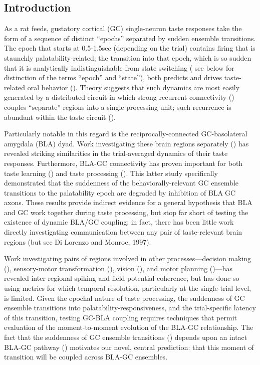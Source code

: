 \begin{refsection}
\section{Introduction}
As a rat feeds, gustatory cortical (GC) single-neuron taste responses take the form of a sequence of distinct “epochs” separated by sudden ensemble transitions. The epoch that starts at 0.5-1.5sec (depending on the trial) contains firing that is staunchly palatability-related; the transition into that epoch, which is so sudden that it is analytically indistinguishable from state switching (\cite{sadacca2016a} see below for distinction of the terms “epoch” and “state”), both predicts and drives taste-related oral behavior (\cite{sadacca2012a,li2016a,mukherjee2019a}). Theory suggests that such dynamics are most easily generated by a distributed circuit in which strong recurrent connectivity (\cite{maass2007a, miller2010a, miller2013a,edelman2013a,mante2013a,kietzmann2019a}) couples “separate” regions into a single processing unit; such recurrence is abundant within the taste circuit (\cite{bielavska1996a,mcdonald1998a,shi1998a}).

Particularly notable in this regard is the reciprocally-connected GC-basolateral amygdala (BLA) dyad. Work investigating these brain regions separately (\cite{katz2001a,fontanini2009a,sadacca2012a}) has revealed striking similarities in the trial-averaged dynamics of their taste responses. Furthermore, BLA-GC connectivity has proven important for both taste learning (\cite{lin2012a,lin2015a,lavi2018a,kayyal2019a}) and taste processing (\cite{lin2021a}). This latter study specifically demonstrated that the suddenness of the behaviorally-relevant GC ensemble transitions to the palatability epoch are degraded by inhibition of BLAGC axons. These results provide indirect evidence for a general hypothesis that BLA and GC work together during taste processing, but stop far short of testing the existence of dynamic BLA/GC coupling; in fact, there has been little work directly investigating communication between any pair of taste-relevant brain regions (but see Di Lorenzo and Monroe, 1997).

Work investigating pairs of regions involved in other processes—decision making (\cite{antzoulatos2016a,place2016a,zielinski2019a}), sensory-motor transformation (\cite{arce-mcshane2016a}), vision (\cite{bastos2015a,zandvakili2015a,saravani2019a,lundqvist2020a}), and motor planning (\cite{yates2017a,ames2019a})—has revealed inter-regional spiking and field potential coherence, but has done so using metrics for which temporal resolution, particularly at the single-trial level, is limited. Given the epochal nature of taste processing, the suddenness of GC ensemble transitions into palatability-responsiveness, and the trial-specific latency of this transition, testing GC-BLA coupling requires techniques that permit evaluation of the moment-to-moment evolution of the BLA-GC relationship. The fact that the suddenness of GC ensemble transitions (\cite{sadacca2016a,mukherjee2019a}) depends upon an intact BLA-GC pathway (\cite{lin2021a}) motivates our novel, central prediction: that this moment of transition will be coupled across BLA-GC ensembles. 


\end{refsection}
